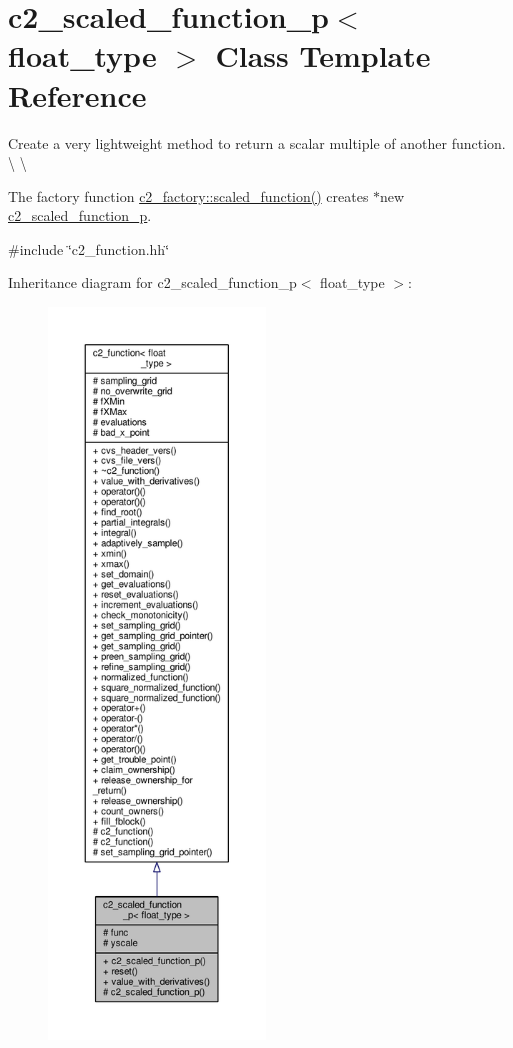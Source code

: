 \hypertarget{classc2__scaled__function__p}{}\section{c2\+\_\+scaled\+\_\+function\+\_\+p$<$ float\+\_\+type $>$ Class Template Reference}
\label{classc2__scaled__function__p}


Create a very lightweight method to return a scalar multiple of another function. \textbackslash{} \textbackslash{}

The factory function \hyperlink{classc2__factory_a81a7b686b7ffa389ad4dcd8d18997332}{c2\+\_\+factory\+::scaled\+\_\+function()} creates $\ast$new \hyperlink{classc2__scaled__function__p}{c2\+\_\+scaled\+\_\+function\+\_\+p}.  




{\ttfamily \#include \char`\"{}c2\+\_\+function.\+hh\char`\"{}}



Inheritance diagram for c2\+\_\+scaled\+\_\+function\+\_\+p$<$ float\+\_\+type $>$\+:
\nopagebreak
\begin{figure}[H]
\begin{center}
\leavevmode
\includegraphics[height=550pt]{classc2__scaled__function__p__inherit__graph}
\end{center}
\end{figure}


